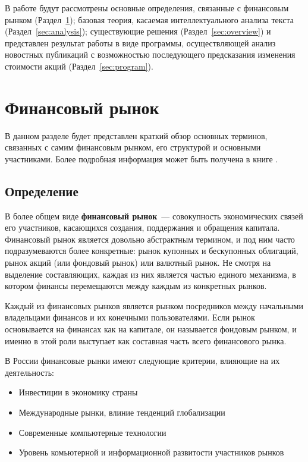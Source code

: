 \documentclass[14pt]{matmex-diploma-custom}
\begin{document}
В работе будут рассмотрены основные определения, связанные с финансовым рынком (Раздел~\ref{sec:finance}); базовая теория, касаемая интеллектуального анализа текста (Раздел~\ref{sec:analysis}); существующие решения (Раздел~\ref{sec:overview}) и представлен результат работы в виде программы, осуществляющей анализ новостных публикаций с возможностью последующего предсказания изменения стоимости акций (Раздел~\ref{sec:program}).

\clearpage\section{Финансовый рынок}

\label{sec:finance}

В данном разделе будет представлен краткий обзор основных терминов, связанных с самим финансовым рынком, его структурой и основными участниками. Более подробная информация может быть получена в книге \cite{book:financial_market}.

\subsection{Определение}

В более общем виде \textbf{финансовый рынок}~--- совокупность экономических связей его участников, касающихся создания, поддержания и обращения капитала. Финансовый рынок является довольно абстрактным термином, и под ним часто подразумеваются более конкретные: рынок купонных и бескупонных облигаций, рынок акций (или фондовый рынок) или валютный рынок. Не смотря на выделение составляющих, каждая из них является частью единого механизма, в котором финансы перемещаются между каждым из конкретных рынков.

Каждый из финансовых рынков является рынком посредников между начальными владельцами финансов и их конечными пользователями. Если рынок основывается на финансах как на капитале, он называется фондовым рынком, и именно в этой роли выступает как составная часть всего финансового рынка.

В России финансовые рынки имеют следующие критерии, влияющие на их деятельность:

\begin{itemize}
\item Инвестиции в экономику страны
\item Международные рынки, влиние тенденций глобализации
\item Современные компьютерные технологии
\item Уровень комьютерной и информационной развитости участников рынков
\end{itemize}
\end{document}
